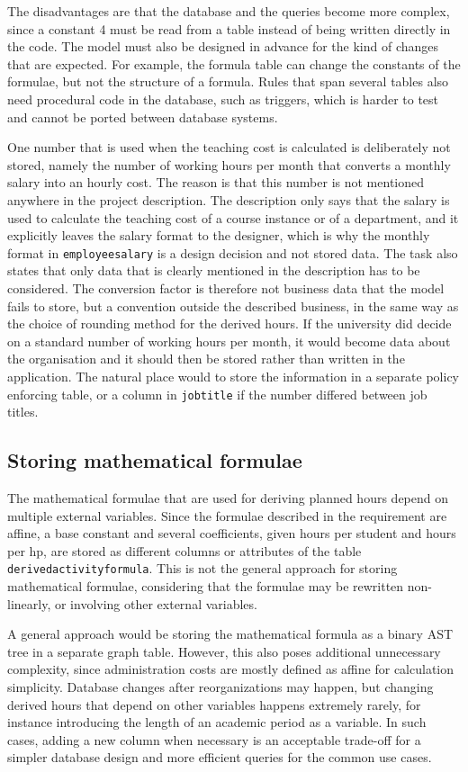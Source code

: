 \documentclass[a4paper]{scrartcl}
\renewcommand{\_}{\textunderscore\allowbreak}
\begin{document}
The disadvantages are that the database and the queries become more complex, since a constant 4 must be read from a table instead of being written directly in the code. The model must also be designed in advance for the kind of changes that are expected. For example, the formula table can change the constants of the formulae, but not the structure of a formula. Rules that span several tables also need procedural code in the database, such as triggers, which is harder to test and cannot be ported between database systems.

One number that is used when the teaching cost is calculated is deliberately not stored, namely the number of working hours per month that converts a monthly salary into an hourly cost. The reason is that this number is not mentioned anywhere in the project description. The description only says that the salary is used to calculate the teaching cost of a course instance or of a department, and it explicitly leaves the salary format to the designer, which is why the monthly format in \texttt{employee\_salary} is a design decision and not stored data. The task also states that only data that is clearly mentioned in the description has to be considered. The conversion factor is therefore not business data that the model fails to store, but a convention outside the described business, in the same way as the choice of rounding method for the derived hours. If the university did decide on a standard number of working hours per month, it would become data about the organisation and it should then be stored rather than written in the application. The natural place would to store the information in a separate policy enforcing table, or a column in \texttt{job\_title} if the number differed between job titles.

\subsection{Storing mathematical formulae}
The mathematical formulae that are used for deriving planned hours depend on multiple external variables. Since the formulae described in the requirement are affine, a base constant and several coefficients, given hours per student and hours per hp, are stored as different columns or attributes of the table \texttt{derived\_activity\_formula}. This is not the general approach for storing mathematical formulae, considering that the formulae may be rewritten non-linearly, or involving other external variables.

A general approach would be storing the mathematical formula as a binary AST tree in a separate graph table. However, this also poses additional unnecessary complexity, since administration costs are mostly defined as affine for calculation simplicity. Database changes after reorganizations may happen, but changing derived hours that depend on other variables happens extremely rarely, for instance introducing the length of an academic period as a variable. In such cases, adding a new column when necessary is an acceptable trade-off for a simpler database design and more efficient queries for the common use cases.
\end{document}
